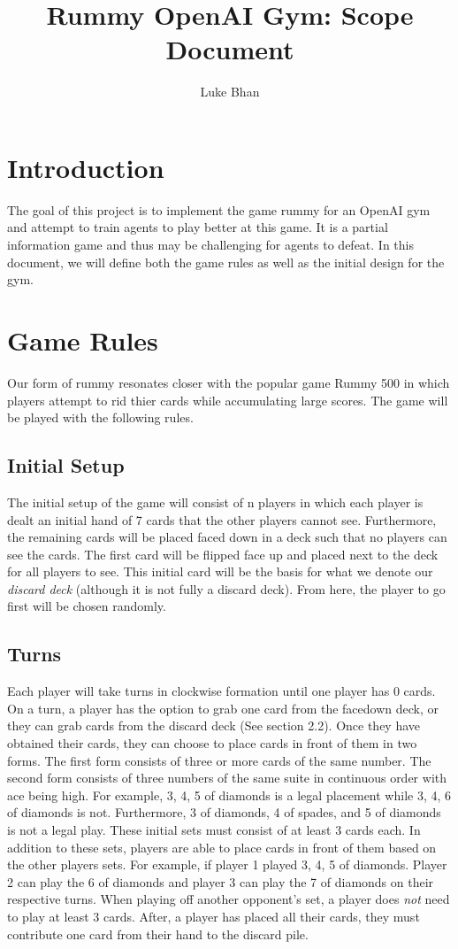 \documentclass{article}
\title{Rummy OpenAI Gym: Scope Document}
\author{Luke Bhan}
\begin{document}
\maketitle

\section{Introduction}
The goal of this project is to implement the game rummy for an OpenAI gym and attempt to train agents to play better at this game. It is a partial information game and thus may be challenging for agents to defeat. In this document, we will define both the game rules as well as the initial design for the gym.

\section{Game Rules}
Our form of rummy resonates closer with the popular game Rummy 500 in which players attempt to rid thier cards while accumulating large scores. The game will be played with the following rules.

\subsection{Initial Setup}
The initial setup of the game will consist of n players in which each player is dealt an initial hand of 7 cards that the other players cannot see. Furthermore, the remaining cards will be placed faced down in a deck such that no players can see the cards. The first card will be flipped face up and placed next to the deck for all players to see. This initial card will be the basis for what we denote our \textit{discard deck} (although it is not fully a discard deck). From here, the player to go first will be chosen randomly. 

\subsection{Turns}
Each player will take turns in clockwise formation until one player has 0 cards. On a turn, a player has the option to grab one card from the facedown deck, or they can grab cards from the discard deck (See section 2.2). Once they have obtained their cards, they can choose to place cards in front of them in two forms. The first form consists of three or more cards of the same number. The second form consists of three numbers of the same suite in continuous order with ace being high. For example, 3, 4, 5 of diamonds is a legal placement while 3, 4, 6 of diamonds is not. Furthermore, 3 of diamonds, 4 of spades, and 5 of diamonds is not a legal play. These initial sets must consist of at least 3 cards each. In addition to these sets, players are able to place cards in front of them based on the other players sets. For example, if player 1 played 3, 4, 5 of diamonds. Player 2 can play the 6 of diamonds and player 3 can play the 7 of diamonds on their respective turns. When playing off another opponent's set, a player does \textit{not} need to play at least 3 cards. After, a player has placed all their cards, they must contribute one card from their hand to the discard pile.
\end{document}
